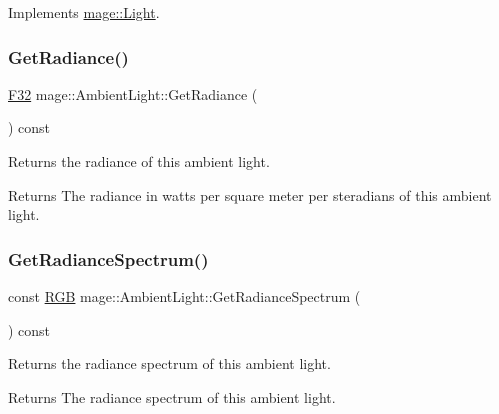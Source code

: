 Implements \hyperlink{classmage_1_1_light_aa613d76a1ebda69efde853d15f75490c}{mage\+::\+Light}.

\hypertarget{classmage_1_1_ambient_light_ab41f72d902f590ebc62ab58427e2bdab}{}\label{classmage_1_1_ambient_light_ab41f72d902f590ebc62ab58427e2bdab} 
\subsubsection{\texorpdfstring{Get\+Radiance()}{GetRadiance()}}
{\footnotesize\ttfamily \hyperlink{namespacemage_aa97e833b45f06d60a0a9c4fc22ae02c0}{F32} mage\+::\+Ambient\+Light\+::\+Get\+Radiance (\begin{DoxyParamCaption}{ }\end{DoxyParamCaption}) const\hspace{0.3cm}{\ttfamily [noexcept]}}

Returns the radiance of this ambient light.

\begin{DoxyReturn}{Returns}
The radiance in watts per square meter per steradians of this ambient light. 
\end{DoxyReturn}
\hypertarget{classmage_1_1_ambient_light_a5d135eeeef619f13435341eebd3fe476}{}\label{classmage_1_1_ambient_light_a5d135eeeef619f13435341eebd3fe476} 
\subsubsection{\texorpdfstring{Get\+Radiance\+Spectrum()}{GetRadianceSpectrum()}}
{\footnotesize\ttfamily const \hyperlink{structmage_1_1_r_g_b}{R\+GB} mage\+::\+Ambient\+Light\+::\+Get\+Radiance\+Spectrum (\begin{DoxyParamCaption}{ }\end{DoxyParamCaption}) const\hspace{0.3cm}{\ttfamily [noexcept]}}

Returns the radiance spectrum of this ambient light.

\begin{DoxyReturn}{Returns}
The radiance spectrum of this ambient light. 
\end{DoxyReturn}
\hypertarget{classmage_1_1_ambient_light_aa6f399dfc958a0073d93f98f0e8f0069}{}\label{classmage_1_1_ambient_light_aa6f399dfc958a0073d93f98f0e8f0069} 

